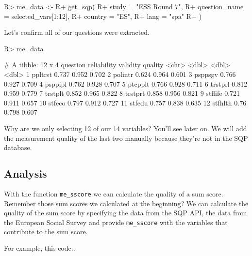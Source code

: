 \documentclass[
]{jss}
\begin{document}
\begin{CodeChunk}

\begin{CodeInput}
R> me_data <-
R+   get_sqp(
R+     study = "ESS Round 7",
R+     question_name = selected_vars[1:12],
R+     country = "ES",
R+     lang = "spa"
R+   )
\end{CodeInput}
\end{CodeChunk}

Let's confirm all of our questions were extracted.

\begin{CodeChunk}

\begin{CodeInput}
R> me_data
\end{CodeInput}

\begin{CodeOutput}
# A tibble: 12 x 4
   question reliability validity quality
   <chr>          <dbl>    <dbl>   <dbl>
 1 ppltrst        0.737    0.952   0.702
 2 polintr        0.624    0.964   0.601
 3 psppsgv        0.766    0.927   0.709
 4 psppipl        0.762    0.928   0.707
 5 ptcpplt        0.766    0.928   0.711
 6 trstprl        0.812    0.959   0.779
 7 trstplt        0.852    0.965   0.822
 8 trstprt        0.858    0.956   0.821
 9 stflife        0.721    0.911   0.657
10 stfeco         0.797    0.912   0.727
11 stfedu         0.757    0.838   0.635
12 stfhlth        0.76     0.798   0.607
\end{CodeOutput}
\end{CodeChunk}

Why are we only selecting 12 of our 14 variables? You'll see later on.
We will add the measurement quality of the last two manually because
they're not in the SQP database.

\hypertarget{analysis}{%
\subsection{Analysis}\label{analysis}}

With the function \texttt{me\_sscore} we can calculate the quality of a
sum score. Remember those sum scores we calculated at the beginning? We
can calculate the quality of the sum score by specifying the data from
the SQP API, the data from the European Social Survey and provide
\texttt{me\_sscore} with the variables that contribute to the sum score.

For example, this code..
\end{document}
